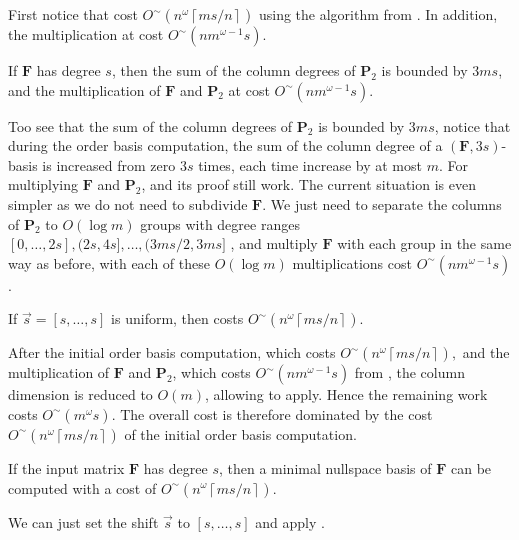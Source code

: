 First notice that  cost $O^{\sim}\left(n^{\omega}\left\lceil ms/n\right\rceil \right)$
using the algorithm from \citet{za2009}. In addition, the multiplication
at  cost $O^{\sim}\left(nm^{\omega-1}s\right)$.
\begin{lem}
\label{lem:multiplyFP2WithUniformShift}If $\mathbf{F}$ has degree
$s$, then the sum of the column degrees of $\mathbf{P}_{2}$ is bounded
by $3ms$, and the multiplication of $\mathbf{F}$ and $\mathbf{P}_{2}$
at  cost \textup{$O^{\sim}\left(nm^{\omega-1}s\right)$.}\end{lem}
\begin{pf}
Too see that the sum of the column degrees of $\mathbf{P}_{2}$ is
bounded by $3ms$, notice that during the order basis computation,
the sum of the column degree of a $\left(\mathbf{F},3s\right)$-basis
is increased from zero $3s$ times, each time increase by at most
$m$. For multiplying $\mathbf{F}$ and $\mathbf{P}_{2}$, 
and its proof still work. The current situation is even simpler as
we do not need to subdivide $\mathbf{F}$. We just need to separate
the columns of $\mathbf{P}_{2}$ to $O\left(\log m\right)$ groups
with degree ranges $\left[0,\dots,2s\right],(2s,4s],\dots,(3ms/2,3ms]$
, and multiply $\mathbf{F}$ with each group in the same way as before,
with each of these $O\left(\log m\right)$ multiplications cost $O^{\sim}\left(nm^{\omega-1}s\right)$. \end{pf}
\begin{lem}
\label{lem:costOfMinimalNullspaceBasisWithUniformShift}If $\vec{s}=\left[s,\dots,s\right]$
is uniform, then  costs $O^{\sim}\left(n^{\omega}\left\lceil ms/n\right\rceil \right)$. \end{lem}
\begin{pf}
After the initial order basis computation, which costs $O^{\sim}\left(n^{\omega}\left\lceil ms/n\right\rceil \right),$
and the multiplication of $\mathbf{F}$ and $\mathbf{P}_{2}$, which
costs $O^{\sim}\left(nm^{\omega-1}s\right)$ from ,
the column dimension is reduced to $O\left(m\right)$, allowing 
to apply. Hence the remaining work costs $O^{\sim}\left(m^{\omega}s\right)$.
The overall cost is therefore dominated by the cost $O^{\sim}\left(n^{\omega}\left\lceil ms/n\right\rceil \right)$
of the initial order basis computation.\end{pf}
\begin{cor}
\label{cor:costOfMinimalNullspaceBasis}If the input matrix $\mathbf{F}$
has degree $s$, then a minimal nullspace basis of $\mathbf{F}$ can
be computed with a cost of $O^{\sim}\left(n^{\omega}\left\lceil ms/n\right\rceil \right)$. \end{cor}
\begin{pf}
We can just set the shift $\vec{s}$ to $\left[s,\dots,s\right]$
and apply .\end{pf}

